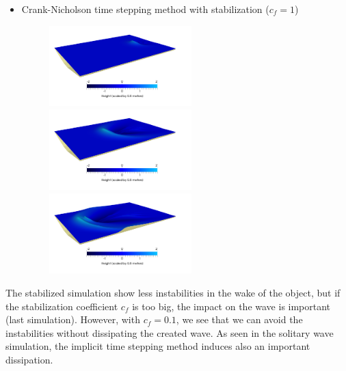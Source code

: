 \documentclass[11pt,a4paper]{article}
\begin{document}
\begin{itemize}
\begin{figure}[!h]
\begin{minipage}[t]{0.3\linewidth}
		\end{minipage}
	\end{figure}
	\item Crank-Nicholson time stepping method with stabilization ($c_f=1$)
	\begin{figure}[!h]
		\begin{minipage}[t]{0.3\linewidth}
			\centering
			\includegraphics[width=5.5cm]{CNStabilized1_150.png}
		\end{minipage}
		\begin{minipage}[t]{0.3\linewidth}
			\centering
			\includegraphics[width=5.5cm]{CNStabilized1_300.png}
		\end{minipage}
		\begin{minipage}[t]{0.3\linewidth}
			\centering
			\includegraphics[width=5.5cm]{CNStabilized1_400.png}
		\end{minipage}
	\end{figure}
\end{itemize}

The stabilized simulation show less instabilities in the wake of the object, but if the stabilization coefficient $c_f$ is too big, the impact on the wave is important (last simulation). However, with $c_f=0.1$, we see that we can avoid the instabilities without dissipating the created wave. As seen in the solitary wave simulation, the implicit time stepping method induces also an important dissipation.

\pagebreak
	
\end{document}
